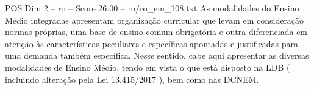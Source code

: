 \begin{textsample}{POS Dim 2 – ro – Score 26.00 – ro/ro\_em\_108.txt}
As modalidades do Ensino Médio integradas apresentam organização curricular que levam em consideração normas próprias, uma base de ensino comum obrigatória e outra diferenciada em atenção às características peculiares e específicas apontadas e justificadas para uma demanda também específica.
Nesse sentido, cabe aqui apresentar as diversas modalidades de Ensino Médio, tendo em vista o que está disposto na LDB ( incluindo alteração pela Lei 13.415/2017 ), bem como nas DCNEM.

\end{textsample}
